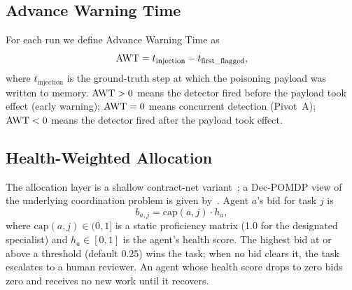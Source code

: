\subsection{Advance Warning Time}
\label{sec:methodology:awt}

For each run we define Advance Warning Time as
\begin{equation}
  \text{AWT}{} = t_{\text{injection}} - t_{\text{first\_flagged}},
\end{equation}
where $t_{\text{injection}}$ is the ground-truth step at which the
poisoning payload was written to memory. $\text{AWT}{} > 0$ means the
detector fired before the payload took effect (early warning);
$\text{AWT}{} = 0$ means concurrent detection (Pivot~A);
$\text{AWT}{} < 0$ means the detector fired after the payload took effect.

\subsection{Health-Weighted Allocation}
\label{sec:methodology:alloc}

The allocation layer is a shallow contract-net
variant~\citep{contractnet}; a Dec-POMDP view of the underlying
coordination problem is given by~\citet{decpomdp}. Agent $a$'s bid
for task $j$ is
\begin{equation}
  b_{a,j} = \text{cap}(a, j) \cdot h_a,
\end{equation}
where $\text{cap}(a, j) \in (0, 1]$ is a static proficiency matrix
(1.0 for the designated specialist) and $h_a \in [0, 1]$ is the agent's
health score. The highest bid at or above a threshold (default 0.25)
wins the task; when no bid clears it, the task escalates to a human
reviewer. An agent whose health score drops to zero bids zero and
receives no new work until it recovers.
